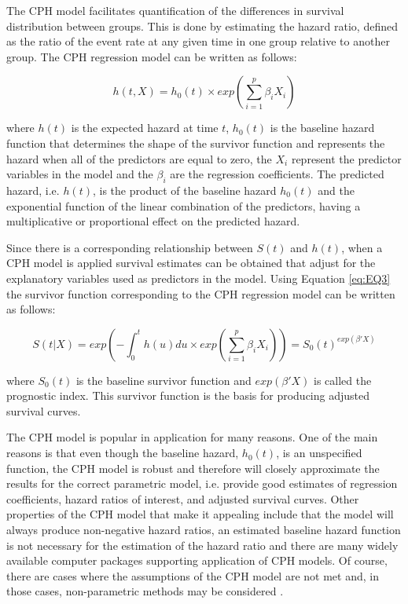 The CPH model facilitates quantification of the differences in survival distribution between groups. This is done by estimating the hazard ratio, defined as the ratio of the event rate at any given time in one group relative to another group. The CPH regression model can be written as follows: 

\begin{equation}
h(t, X) = h_0(t) \times exp(\sum_{i=1}^{p}\beta_iX_i)
\end{equation}

where $h(t)$ is the expected hazard at time $t$, $h_0(t)$ is the baseline hazard function that determines the shape of the survivor function and represents the hazard when all of the predictors are equal to zero, the $X_{i}$ represent the predictor variables in the model and the $\beta_i$ are the regression coefficients. The predicted hazard, i.e. $h(t)$, is the product of the baseline hazard $h_0(t)$ and the exponential function of the linear combination of the predictors, having a multiplicative or proportional effect on the predicted hazard. 

Since there is a corresponding relationship between $S(t)$ and $h(t)$, when a CPH model is applied survival estimates can be obtained that adjust for the explanatory variables used as predictors in the model. Using Equation \ref{eq:EQ3} the survivor function corresponding to the CPH regression model can be written as follows: 

\begin{equation}
S(t|X) = exp(-\int_0^th(u)du \times exp(\sum_{i=1}^{p}\beta_iX_i)) = S_0(t)^{exp(\beta'X)}
\end{equation}

where $S_0(t)$ is the baseline survivor function and $exp(\beta'X)$ is called the prognostic index. This survivor function is the basis for producing adjusted survival curves.

The CPH model is popular in application for many reasons. One of the main reasons is that even though the baseline hazard, $h_0(t)$, is an unspecified function, the CPH model is robust and therefore will closely approximate the results for the correct parametric model, i.e. provide good estimates of regression coefficients, hazard ratios of interest, and adjusted survival curves. Other properties of the CPH model that make it appealing include that the model will always produce non-negative hazard ratios, an estimated baseline hazard function is not necessary for the estimation of the hazard ratio and there are many widely available computer packages supporting application of CPH models. Of course, there are cases where the assumptions of the CPH model are not met and, in those cases, non-parametric methods may be considered \citep{kleinbaum_klein_2012}.

